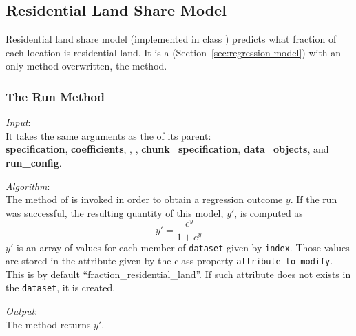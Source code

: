 %
\subsection{Residential Land Share Model}
\modelsindex
%
\label{sec:residential-land-share-model}

Residential land share model \modelsindex (implemented in class
) \modelsindex predicts what fraction of each location is
residential land. It is a  \modelsindex
(Section~\ref{sec:regression-model}) \modelsindex with an only method overwritten, the
 method.

\subsubsection{The Run Method}
%
{\it Input}:\\[1mm]
It takes the same arguments as the  of its parent: \\
{\bf specification}, {\bf coefficients}, , , {\bf
  chunk_specification}, {\bf data_objects}, and {\bf run_config}.

{\it Algorithm}:\\[1mm]
The  method of  \modelsindex is invoked in order to
obtain a regression outcome $y$. If the run
was successful, the resulting quantity of this model, $y'$, is computed as
\[
y' = \frac{e^y}{1+e^y}
\]
$y'$ is an array of values for each member of \verb|dataset| \datasetindex given by
\verb|index|. Those values are stored in the attribute \attributesindex given by the class
property \verb|attribute_to_modify|. This is by default
``fraction_residential_land''. If such attribute \attributesindex does not exists in the
\verb|dataset|, \datasetindex it is created.

{\it Output}:\\[1mm]
The method returns $y'$.

